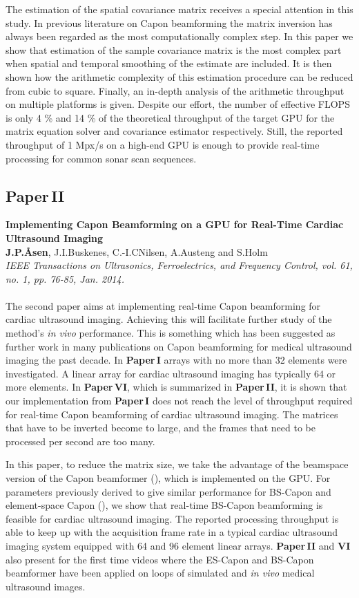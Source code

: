 The estimation of the spatial covariance matrix receives a special attention in this study. In previous literature on Capon beamforming the matrix inversion has always been regarded as the most computationally complex step. In this paper we show that estimation of the sample covariance matrix is the most complex part when spatial and temporal smoothing of the estimate are included. It is then shown how the arithmetic complexity of this estimation procedure can be reduced from cubic to square. Finally, an in-depth analysis of the arithmetic throughput on multiple platforms is given. Despite our effort, the number of effective FLOPS is only 4 \% and 14 \% of the theoretical throughput of the target GPU for the matrix equation solver and covariance estimator respectively. Still, the reported throughput of 1 Mpx/s on a high-end GPU is enough to provide real-time processing for common sonar scan sequences.

\subsection{Paper\,II}
\textbf{Implementing Capon Beamforming on a GPU for Real-Time Cardiac Ultrasound Imaging}\\
\textbf{J.\:P.\:\AA{}sen}, J.\:I.\:Buskenes, C.-I.\:C\:Nilsen, A.\:Austeng and S.\:Holm\\
{\it IEEE Transactions on Ultrasonics, Ferroelectrics, and Frequency Control, vol. 61, no. 1, pp. 76-85, Jan. 2014.}\\\\
The second paper aims at implementing real-time Capon beamforming for cardiac ultrasound imaging. Achieving this will facilitate further study of the method's \textit{in vivo} performance. This is something which has been suggested as further work in many publications on Capon beamforming for medical ultrasound imaging the past decade. In \textbf{Paper\,I} arrays with no more than 32 elements were investigated. A linear array for cardiac ultrasound imaging has typically 64 or more elements. In \textbf{Paper\,VI}, which is summarized in \textbf{Paper\,II}, it is shown that our implementation from  \textbf{Paper\,I} does not reach the level of throughput required for real-time Capon beamforming of cardiac ultrasound imaging. The matrices that have to be inverted become to large, and the frames that need to be processed per second are too many.

In this paper, to reduce the matrix size, we take the advantage of the beamspace version of the Capon beamformer (), which is implemented on the GPU. For parameters previously derived to give similar performance for BS-Capon and element-space Capon (), we show that real-time BS-Capon beamforming is feasible for cardiac ultrasound imaging. The reported processing throughput is able to keep up with the acquisition frame rate in a typical cardiac ultrasound imaging system equipped with 64 and 96 element linear arrays.  \textbf{Paper\,II} and \textbf{VI} also present for the first time videos where the ES-Capon and BS-Capon beamformer have been applied on loops of simulated and \textit{in vivo} medical ultrasound images.

